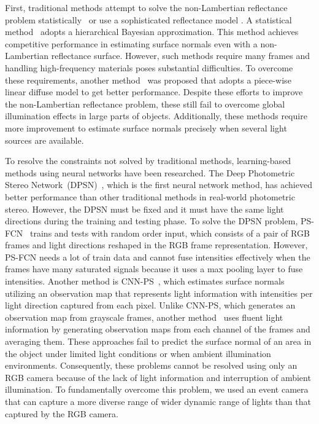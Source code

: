 \documentclass[preprint,12pt,authoryear]{elsarticle}
\begin{document}
First, traditional methods attempt to solve the non-Lambertian reflectance problem statistically~\citep{ikehata2012robust,ikehata2014photometric} or use a sophisticated reflectance model \citep{oren1995generalization,hertzmann2003shape,alldrin2008photometric,goldman2009shape}. A statistical method~\citep{ikehata2012robust} adopts a hierarchical Bayesian approximation. This method achieves competitive performance in estimating surface normals even with a non-Lambertian reflectance surface. However, such methods require many frames and handling high-frequency materials poses substantial difficulties. To overcome these requirements, another method~\citep{ikehata2014photometric} was proposed that adopts a piece-wise linear diffuse model to get better performance. Despite these efforts to improve the non-Lambertian reflectance problem, these still fail to overcome global illumination effects in large parts of objects. Additionally, these methods require more improvement to estimate surface normals precisely when several light sources are available.

To resolve the constraints not solved by traditional methods, learning-based methods using neural networks have been researched. The Deep Photometric Stereo Network~(DPSN)~\citep{santo2017deep}, which is the first neural network method, has achieved better performance than other traditional methods in real-world photometric stereo. However, the DPSN must be fixed and it must have the same light directions during the training and testing phase. To solve the DPSN problem, PS-FCN~\citep{chen2018ps} trains and tests with random order input, which consists of a pair of RGB frames and light directions reshaped in the RGB frame representation. However, PS-FCN needs a lot of train data and cannot fuse intensities effectively when the frames have many saturated signals because it uses a max pooling layer to fuse intensities. Another method is CNN-PS~\citep{ikehata2018cnn}, which estimates surface normals utilizing an observation map that represents light information with intensities per light direction captured from each pixel. Unlike CNN-PS, which generates an observation map from grayscale frames, another method~\citep{logothetis2021px} uses fluent light information by generating observation maps from each channel of the frames and averaging them. These approaches fail to predict the surface normal of an area in the object under limited light conditions or when ambient illumination environments. Consequently, these problems cannot be resolved using only an RGB camera because of the lack of light information and interruption of ambient illumination. To fundamentally overcome this problem, we used an event camera that can capture a more diverse range of wider dynamic range of lights than that captured by the RGB camera.
\end{document}
